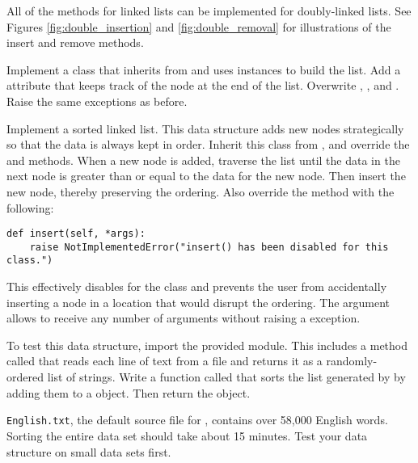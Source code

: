 All of the methods for linked lists can be implemented for doubly-linked lists.
See Figures \ref{fig:double_insertion} and \ref{fig:double_removal} for illustrations of the insert and remove methods.

\begin{problem}
Implement a  class that inherits from  and uses  instances to build the list.
Add a  attribute that keeps track of the node at the end of the list.
Overwrite , , and .
Raise the same exceptions as before.
\end{problem}

\begin{problem}
Implement a sorted linked list.
This data structure adds new nodes strategically so that the data is always kept in order.
Inherit this class from , and override the  and  methods.
When a new node is added, traverse the list until the data in the next node is greater than or equal to the data for the new node.
Then insert the new node, thereby preserving the ordering.
Also override the  method with the following:

\begin{lstlisting}
def insert(self, *args):
    raise NotImplementedError("insert() has been disabled for this class.")
\end{lstlisting}

This effectively disables  for the  class and prevents the user from accidentally inserting a node in a location that would disrupt the ordering.
The  argument allows  to receive any number of arguments without raising a  exception.

To test this data structure, import the provided  module.
This includes a method called  that reads each line of text from a file and returns it as a randomly-ordered list of strings.
Write a function called  that sorts the list generated by  by adding them to a  object.
Then return the object.

\begin{warn}
\texttt{English.txt}, the default source file for , contains over 58,000 English words.
Sorting the entire data set should take about 15 minutes.
Test your data structure on small data sets first.
\end{warn}
\end{problem}

